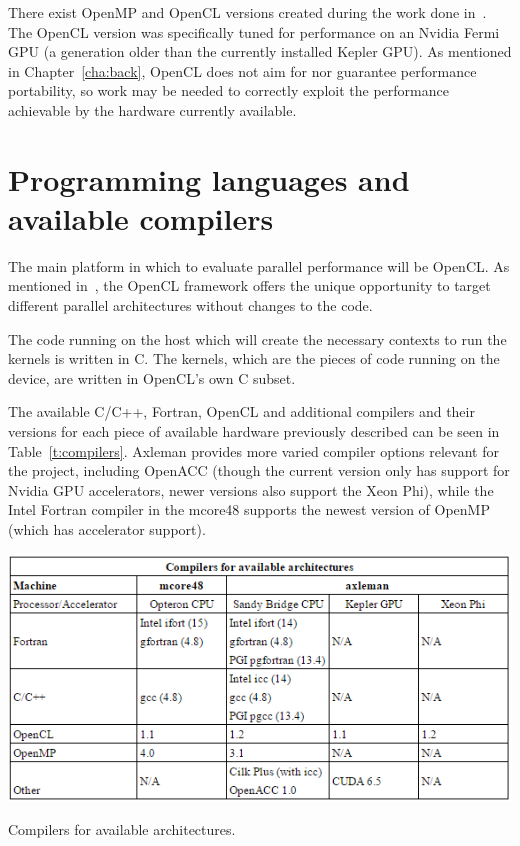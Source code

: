 There exist OpenMP and OpenCL versions created during the work done in~\cite{pappas2012}. The OpenCL version was specifically tuned for performance on an Nvidia Fermi GPU (a generation older than the currently installed Kepler GPU). As mentioned in Chapter~\ref{cha:back}, OpenCL does not aim for nor guarantee performance portability, so work may be needed to correctly exploit the performance achievable by the hardware currently available.

\section{Programming languages and available compilers}

The main platform in which to evaluate parallel performance will be OpenCL. As mentioned in~\cite{dolbeau2013one}, the OpenCL framework offers the unique opportunity to target different parallel architectures without changes to the code.

The code running on the host which will create the necessary contexts to run the kernels is written in C. The kernels, which are the pieces of code running on the device, are written in OpenCL's own C subset.

The available C/C++, Fortran, OpenCL and additional compilers and their versions for each piece of available hardware previously described can be seen in Table~\ref{t:compilers}. Axleman provides more varied compiler options relevant for the project, including OpenACC (though the current version only has support for Nvidia GPU accelerators, newer versions also support the Xeon Phi), while the Intel Fortran compiler in the mcore48 supports the newest version of OpenMP (which has accelerator support).

\begin{table}[!h]
\begin{center}
\centerline{\includegraphics[width=\columnwidth]{img/compilers}}
\caption{Compilers for available architectures.}
\label{t:compilers}
\end{center}
\end{table}

